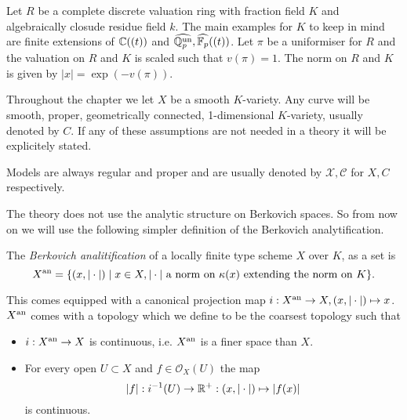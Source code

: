 Let $R$ be a complete discrete valuation ring with fraction field $K$ and algebraically closude residue field $k$. 
The main examples for $K$ to keep in mind are finite extensions of $\mathbb{C}((t))$ and $ \widehat{\mathbb{Q}_p^{\text{un}}}, \widehat{\mathbb{F}_p}((t))$.  
Let $\pi$ be a uniformiser for $R$ and the valuation on $R$ and $K$ is scaled such that $v(\pi) = 1$. 
The norm on $R$ and $K$ is given by $|x| = \exp(-v(\pi))$. 

Throughout the chapter we let $X$ be a smooth $K$-variety. 
Any curve will be smooth, proper, geometrically connected, 1-dimensional $K$-variety, usually denoted by $C$. 
If any of these assumptions are not needed in a theory it will be explicitely stated. 

Models are always regular and proper and are usually denoted by $\mathscr X, \mathscr C$ for $X, C$ respectively.  

The theory does not use the analytic structure on Berkovich spaces. 
So from now on we will use the following simpler definition of the Berkovich analytification. 

\begin{definition}\label{def:berkovich_analytification_explicit}
	The \emph{Berkovich analitification} of a locally finite type scheme $X$ over  $K$, as a set is \[
		X{}^{\text{an}} = \{(x, |\cdot |)  \mid x\in X, |\cdot | \text{ a norm on } \kappa(x) \text{ extending the norm on }K \} 
	.\] 

	This comes equipped with a canonical projection map $i: X{}^{\text{an}} \to X, (x, |\cdot |) \mapsto  x$.
	$X{}^{\text{an}} $ comes with a topology which we define to be the coarsest topology such that 
	\begin{itemize}
		\item $i: X{}^{\text{an}} \to X$ is continuous, i.e. $X{}^{\text{an}}$ is a finer space than  $X$. 
		\item For every open $U \subset X$ and $f \in \mathcal{O}_X(U)$ the map  \[
				|f|: i^{-1}(U) \to \mathbb{R}^{+}: (x, |\cdot |) \mapsto  |f(x)|
		\] 
		is continuous.
	\end{itemize}
\end{definition}

